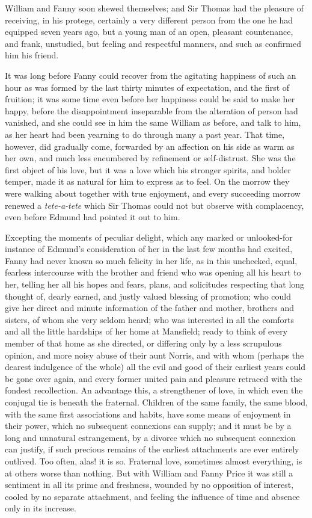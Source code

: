 \documentclass{article}
\begin{document}
William and Fanny soon shewed themselves; and Sir Thomas
had the pleasure of receiving, in his protege, certainly a
very different person from the one he had equipped seven
years ago, but a young man of an open, pleasant countenance,
and frank, unstudied, but feeling and respectful manners,
and such as confirmed him his friend.

It was long before Fanny could recover from the agitating
happiness of such an hour as was formed by the last
thirty minutes of expectation, and the first of fruition;
it was some time even before her happiness could be said
to make her happy, before the disappointment inseparable
from the alteration of person had vanished, and she could
see in him the same William as before, and talk to him,
as her heart had been yearning to do through many
a past year.  That time, however, did gradually come,
forwarded by an affection on his side as warm as her own,
and much less encumbered by refinement or self-distrust.
She was the first object of his love, but it was a love
which his stronger spirits, and bolder temper, made it
as natural for him to express as to feel.  On the morrow
they were walking about together with true enjoyment,
and every succeeding morrow renewed a \emph{tete-a-tete}
which Sir Thomas could not but observe with complacency,
even before Edmund had pointed it out to him.

Excepting the moments of peculiar delight, which any marked
or unlooked-for instance of Edmund's consideration of her
in the last few months had excited, Fanny had never known
so much felicity in her life, as in this unchecked, equal,
fearless intercourse with the brother and friend who was opening
all his heart to her, telling her all his hopes and fears,
plans, and solicitudes respecting that long thought of,
dearly earned, and justly valued blessing of promotion;
who could give her direct and minute information of the
father and mother, brothers and sisters, of whom she
very seldom heard; who was interested in all the comforts
and all the little hardships of her home at Mansfield;
ready to think of every member of that home as she directed,
or differing only by a less scrupulous opinion, and more
noisy abuse of their aunt Norris, and with whom (perhaps
the dearest indulgence of the whole) all the evil and
good of their earliest years could be gone over again,
and every former united pain and pleasure retraced
with the fondest recollection.  An advantage this,
a strengthener of love, in which even the conjugal tie
is beneath the fraternal.  Children of the same family,
the same blood, with the same first associations and habits,
have some means of enjoyment in their power, which no
subsequent connexions can supply; and it must be by a
long and unnatural estrangement, by a divorce which no
subsequent connexion can justify, if such precious remains
of the earliest attachments are ever entirely outlived.
Too often, alas! it is so.  Fraternal love, sometimes
almost everything, is at others worse than nothing.
But with William and Fanny Price it was still a sentiment
in all its prime and freshness, wounded by no opposition
of interest, cooled by no separate attachment, and feeling
the influence of time and absence only in its increase.
\end{document}
